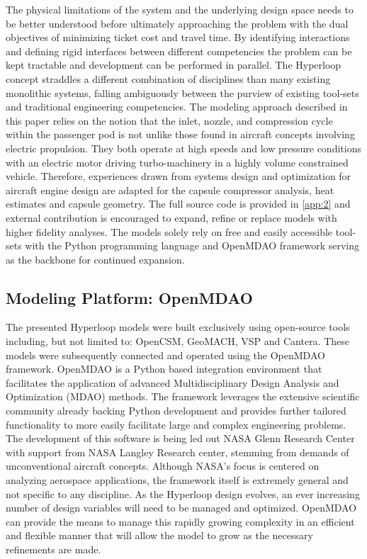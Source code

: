 \documentclass[heading.tex]{subfiles}
\begin{document}
The physical limitations of the system and the underlying design space needs to be better understood before ultimately approaching the
problem with the dual objectives of minimizing ticket cost and travel time. By identifying interactions and defining rigid interfaces between different
competencies the problem can
be kept tractable and development can be performed in parallel. The Hyperloop concept straddles a different combination of disciplines than many
existing monolithic systems, falling ambiguously between the purview of existing tool-sets and traditional engineering competencies. The modeling
approach described in this paper relies on the notion that the inlet, nozzle, and compression cycle within the passenger pod is not unlike those
found in aircraft concepts involving electric propulsion. They both operate at high speeds and low pressure conditions with an electric motor
driving turbo-machinery in a highly volume constrained vehicle. Therefore, experiences drawn from systems design and optimization for aircraft engine
design are adapted for the capsule compressor analysis, heat estimates and capsule geometry. The full source code is provided in
 \cref{app:2} and external contribution is encouraged to expand, refine or replace models with higher fidelity analyses. The models solely rely on
free and easily accessible tool-sets with the Python programming language and OpenMDAO framework serving as the backbone for continued expansion.  

\subsection{Modeling Platform: OpenMDAO}


The presented Hyperloop models were built exclusively using open-source tools including, but not limited to: OpenCSM, GeoMACH, VSP and
Cantera. These models were subsequently connected and operated using the OpenMDAO framework. OpenMDAO is a Python based
integration environment that facilitates the application of advanced Multidisciplinary Design Analysis and Optimization (MDAO) methods.
The framework leverages the extensive scientific community already backing Python development and provides further tailored functionality
to more easily facilitate large and complex engineering problems. The development of this software is being led out NASA Glenn Research
Center with support from NASA Langley Research center, stemming from demands of unconventional aircraft concepts. Although NASA's
focus is centered on analyzing aerospace applications, the framework itself is extremely general and not specific to any discipline. As the
Hyperloop design evolves, an ever increasing number of design variables will need to be managed and optimized. OpenMDAO can provide
the means to manage this rapidly growing complexity in an efficient and flexible manner that will allow the model to grow as the necessary
refinements are made.
\end{document}

